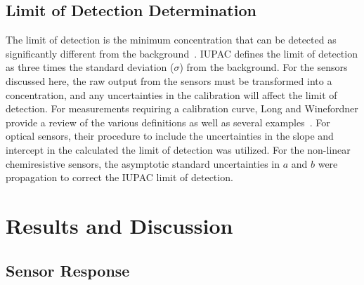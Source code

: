 \documentclass[sensors,article,submit,moreauthors,pdftex]{Definitions/mdpi}
\begin{document}
		\subsection{Limit of Detection Determination}
			\label{sec:method_detection}
			The limit of detection is the minimum concentration that can be detected as significantly different from the background~\cite{long_limit_1983,currie_detection:_1997,mocak_j._statistical_2009}.
			IUPAC defines the limit of detection as three times the standard deviation ($\sigma$) from the background.
			For the sensors discussed here, the raw output from the sensors must be transformed into a concentration, and any uncertainties in the calibration will affect the limit of detection.
			For measurements requiring a calibration curve, Long and Winefordner provide a review of the various definitions as well as several examples~\cite{long_limit_1983}.
			For optical sensors, their procedure to include the uncertainties in the slope and intercept in the calculated the limit of detection was utilized.
			For the non-linear chemiresistive sensors, the asymptotic standard uncertainties in $a$ and $b$ were propagation to correct the IUPAC limit of detection.
			
	
	\section{Results and Discussion}
	
		\subsection{Sensor Response}
		\label{sec:time}
	
			
			
\end{document}
